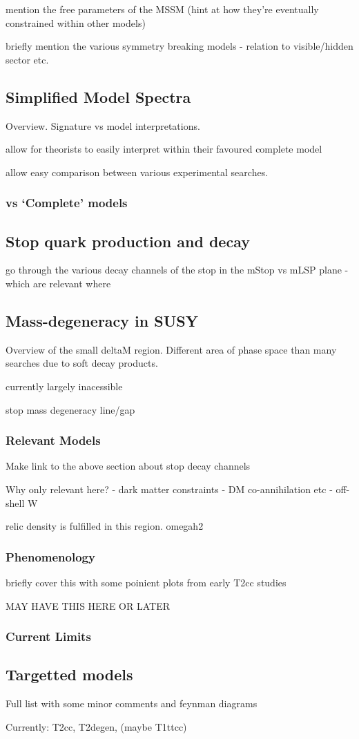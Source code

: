 mention the free parameters of the MSSM (hint at how they're eventually 
constrained within other models)

briefly mention the various symmetry breaking models - relation to visible/hidden sector 
etc.


\subsection{Simplified Model Spectra}
Overview. Signature vs model interpretations.

allow for theorists to easily interpret within their favoured complete model

allow easy comparison between various experimental searches.

\subsubsection{vs `Complete' models}

\subsection{Stop quark production and decay}
go through the various decay channels of the stop in the mStop vs mLSP plane
- which are relevant where

\subsection{Mass-degeneracy in SUSY}
Overview of the small deltaM region. Different area of phase space than many searches due to soft decay 
products.

currently largely inacessible

stop mass degeneracy line/gap

\subsubsection{Relevant Models}
Make link to the above section about stop decay channels

Why only relevant here?
- dark matter constraints - DM co-annihilation etc
- off-shell W

relic density is fulfilled in this region. omegah2

\subsubsection{Phenomenology}
briefly cover this with some poinient plots from early T2cc studies

MAY HAVE THIS HERE OR LATER
\subsubsection{Current Limits}

\subsection{Targetted models}
Full list with some minor comments and feynman diagrams

Currently: T2cc, T2degen, (maybe T1ttcc)